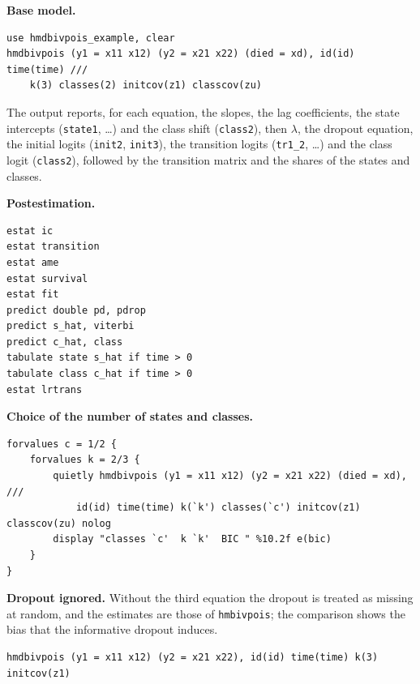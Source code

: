 \documentclass[11pt,a4paper]{article}
\newcommand{\cmd}[1]{\texttt{#1}}
\begin{document}
\medskip\noindent\textbf{Base model.}\par\nopagebreak
\begin{lstlisting}
use hmdbivpois_example, clear
hmdbivpois (y1 = x11 x12) (y2 = x21 x22) (died = xd), id(id) time(time) ///
    k(3) classes(2) initcov(z1) classcov(zu)
\end{lstlisting}
The output reports, for each equation, the slopes, the lag coefficients, the state intercepts
(\cmd{state1}, \dots) and the class shift (\cmd{class2}), then $\lambda$, the dropout equation, the
initial logits (\cmd{init2}, \cmd{init3}), the transition logits (\cmd{tr1\_2}, \dots) and the class logit
(\cmd{class2}), followed by the transition matrix and the shares of the states and classes.

\medskip\noindent\textbf{Postestimation.}\par\nopagebreak
\begin{lstlisting}
estat ic
estat transition
estat ame
estat survival
estat fit
predict double pd, pdrop
predict s_hat, viterbi
predict c_hat, class
tabulate state s_hat if time > 0
tabulate class c_hat if time > 0
estat lrtrans
\end{lstlisting}

\medskip\noindent\textbf{Choice of the number of states and classes.}\par\nopagebreak
\begin{lstlisting}
forvalues c = 1/2 {
    forvalues k = 2/3 {
        quietly hmdbivpois (y1 = x11 x12) (y2 = x21 x22) (died = xd), ///
            id(id) time(time) k(`k') classes(`c') initcov(z1) classcov(zu) nolog
        display "classes `c'  k `k'  BIC " %10.2f e(bic)
    }
}
\end{lstlisting}

\medskip\noindent\textbf{Dropout ignored.} Without the third equation the dropout is treated as missing at
random, and the estimates are those of \cmd{hmbivpois}; the comparison shows the bias that the
informative dropout induces.
\begin{lstlisting}
hmdbivpois (y1 = x11 x12) (y2 = x21 x22), id(id) time(time) k(3) initcov(z1)
\end{lstlisting}
\end{document}
